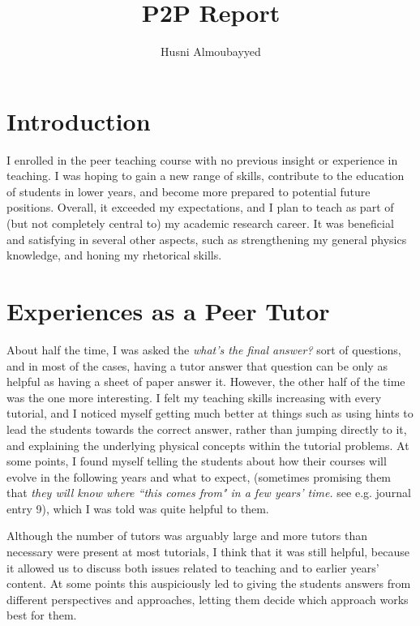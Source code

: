 \documentclass[12pt,avenir,a4paper,final]{iopart}
\begin{document}
\maketitle
 
\title[P2P Report]{P2P Report}
\author{Husni Almoubayyed}
\address{School of Physics and Astronomy, University of Glasgow}

\section{Introduction}
\indent \par{}I enrolled in the peer teaching course with no previous insight or experience in teaching. I was hoping to gain a new range of skills, contribute to the education of students in lower years, and become more prepared to potential future positions. Overall, it exceeded my expectations, and I plan to teach as part of (but not completely central to) my academic research career. It was beneficial and satisfying in several other aspects, such as strengthening my general physics knowledge, and honing my rhetorical skills. 

\section{Experiences as a Peer Tutor}
\label{1}
\indent \par{} About half the time, I was asked the \emph{what's the final answer?} sort of questions, and in most of the cases, having a tutor answer that question can be only as helpful as having a sheet of paper answer it. However, the other half of the time was the one more interesting. I felt my teaching skills increasing with every tutorial, and I noticed myself getting much better at things such as using hints to lead the students towards the correct answer, rather than jumping directly to it, and explaining the underlying physical concepts within the tutorial problems. At some points, I found myself telling the students about how their courses will evolve in the following years and what to expect, (sometimes promising them that \emph{they will know where ``this comes from" in a few years' time.} see e.g. journal entry 9), which I was told was quite helpful to them. 

\indent \par{}Although the number of tutors was arguably large and more tutors than necessary were present at most tutorials, I think that it was still helpful, because it allowed us to discuss both issues related to teaching and to earlier years' content. At some points this auspiciously led to giving the students answers from different perspectives and approaches, letting them decide which approach works best for them.
\end{document}
